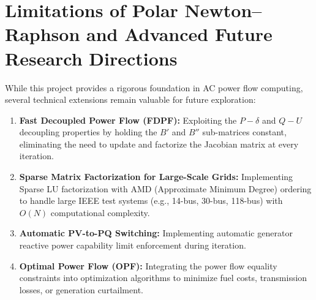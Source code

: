 \documentclass[12pt,a4paper,oneside]{report}
\begin{document}
\section{Limitations of Polar Newton--Raphson and Advanced Future Research Directions}
While this project provides a rigorous foundation in AC power flow computing, several technical extensions remain valuable for future exploration:
\begin{enumerate}
    \item \textbf{Fast Decoupled Power Flow (FDPF):} Exploiting the $P-\delta$ and $Q-U$ decoupling properties by holding the $B'$ and $B''$ sub-matrices constant, eliminating the need to update and factorize the Jacobian matrix at every iteration.
    \item \textbf{Sparse Matrix Factorization for Large-Scale Grids:} Implementing Sparse LU factorization with AMD (Approximate Minimum Degree) ordering to handle large IEEE test systems (e.g., 14-bus, 30-bus, 118-bus) with $O(N)$ computational complexity.
    \item \textbf{Automatic PV-to-PQ Switching:} Implementing automatic generator reactive power capability limit enforcement during iteration.
    \item \textbf{Optimal Power Flow (OPF):} Integrating the power flow equality constraints into optimization algorithms to minimize fuel costs, transmission losses, or generation curtailment.
\end{enumerate}
\end{document}
